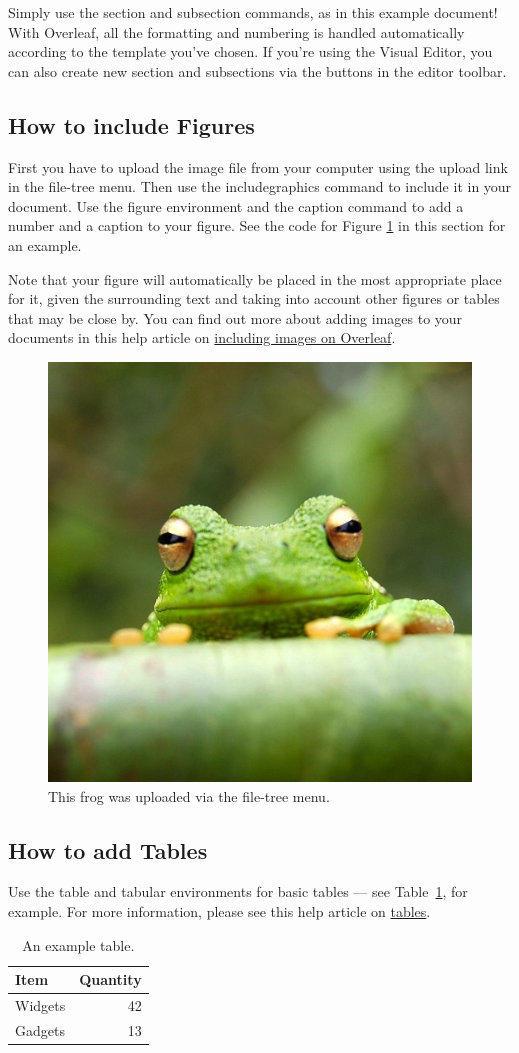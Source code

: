 \documentclass{report}
\begin{document}
Simply use the section and subsection commands, as in this example document! With Overleaf, all the formatting and numbering is handled automatically according to the template you've chosen. If you're using the Visual Editor, you can also create new section and subsections via the buttons in the editor toolbar.

\subsection{How to include Figures}

First you have to upload the image file from your computer using the upload link in the file-tree menu. Then use the includegraphics command to include it in your document. Use the figure environment and the caption command to add a number and a caption to your figure. See the code for Figure \ref{fig:frog} in this section for an example.

Note that your figure will automatically be placed in the most appropriate place for it, given the surrounding text and taking into account other figures or tables that may be close by. You can find out more about adding images to your documents in this help article on \href{https://www.overleaf.com/learn/how-to/Including_images_on_Overleaf}{including images on Overleaf}.

\begin{figure}
\centering
\includegraphics[width=0.25\linewidth]{frog.jpg}
\caption{\label{fig:frog}This frog was uploaded via the file-tree menu.}
\end{figure}

\subsection{How to add Tables}

Use the table and tabular environments for basic tables --- see Table~\ref{tab:widgets}, for example. For more information, please see this help article on \href{https://www.overleaf.com/learn/latex/tables}{tables}. 

\begin{table}
\centering
\begin{tabular}{l|r}
Item & Quantity \\\hline
Widgets & 42 \\
Gadgets & 13
\end{tabular}
\caption{\label{tab:widgets}An example table.}
\end{table}
\end{document}
